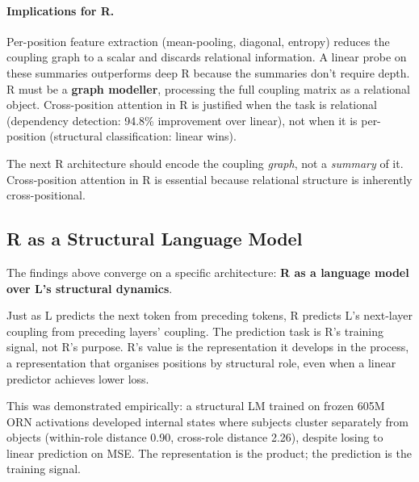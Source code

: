 \documentclass[11pt, a4paper]{article}
\theoremstyle{plain}
\theoremstyle{definition}
\theoremstyle{remark}
\begin{document}
\paragraph{Implications for R.}
Per-position feature extraction (mean-pooling, diagonal, entropy) reduces the coupling graph to a scalar and discards relational information.
A linear probe on these summaries outperforms deep R because the summaries don't require depth.
R must be a \textbf{graph modeller}, processing the full coupling matrix as a relational object.
Cross-position attention in R is justified when the task is relational (dependency detection: 94.8\% improvement over linear), not when it is per-position (structural classification: linear wins).

The next R architecture should encode the coupling \emph{graph}, not a \emph{summary} of it.
Cross-position attention in R is essential because relational structure is inherently cross-positional.

\subsection{R as a Structural Language Model}
\label{app:structural-lm}

The findings above converge on a specific architecture: \textbf{R as a language model over L's structural dynamics}.

Just as L predicts the next token from preceding tokens, R predicts L's next-layer coupling from preceding layers' coupling.
The prediction task is R's training signal, not R's purpose.
R's value is the representation it develops in the process, a representation that organises positions by structural role, even when a linear predictor achieves lower loss.

This was demonstrated empirically: a structural LM trained on frozen 605M ORN activations developed internal states where subjects cluster separately from objects (within-role distance 0.90, cross-role distance 2.26), despite losing to linear prediction on MSE.
The representation is the product; the prediction is the training signal.
\end{document}
